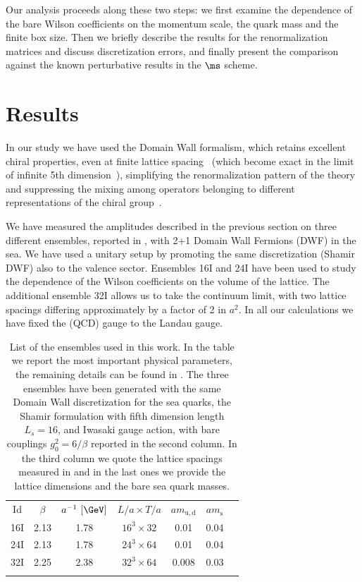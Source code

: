 \documentclass[aps,prd,twocolumn,nofootinbib,showpacs,superscriptaddress]{revtex4-1}
\begin{document}
Our analysis proceeds along these two steps: we first examine the dependence of 
the bare Wilson coefficients on the momentum scale, the quark mass and the finite box size.
Then we briefly describe the results for the renormalization matrices 
and discuss discretization errors, 
and finally present the comparison against the known perturbative results
in the $\ms$ scheme.


\section{Results}

In our study we have used 
the Domain Wall formalism, 
which retains excellent chiral properties, even at finite 
lattice spacing~\cite{Blum:1996jf,Blum:1997mz} %
(which become exact in the limit of
infinite 5th dimension~\cite{Shamir:1993zy,Furman:1994ky}), 
simplifying the renormalization pattern of the theory and 
suppressing the mixing among operators belonging to different representations of the chiral group~\cite{Blum:2001xb}.

We have measured the amplitudes described in the previous section on three different ensembles, 
reported in , with 2+1 Domain Wall Fermions (DWF) in the sea. 
We have used a unitary setup by promoting the same discretization (Shamir DWF)
also to the valence sector. Ensembles 16I and 24I have been used to study the
dependence of the Wilson coefficients on the volume of the lattice. The additional ensemble 32I 
allows us to take the continuum limit, with two lattice spacings differing approximately by
a factor of 2 in $a^2$. In all our calculations we have fixed the (QCD) gauge to the Landau gauge.\\


\begin{table}
\begin{tabular}{ccccccc}
\toprule
Id & $\beta$ & $a^{-1}~[\GeV]$ & $L/a \times T/a$ & $am_\mathrm{u,d}$ & $am_\mathrm s$\\
\colrule
16I & 2.13 & 1.78 & $16^3 \times 32$ & 0.01  &  0.04 \\
24I & 2.13 & 1.78 & $24^3 \times 64$ & 0.01  &  0.04 \\
32I & 2.25 & 2.38 & $32^3 \times 64$ & 0.008 &  0.03 \\ 
\botrule
\end{tabular}
\caption{List of the ensembles used in this work. In the table we report the most important
physical parameters, the remaining details can be found in . 
The three ensembles have been generated with
the same Domain Wall discretization for the sea quarks, 
the Shamir formulation with  
fifth dimension length $L_s = 16$, 
and Iwasaki gauge action, 
with bare couplings $g_0^2= 6 / \beta$ reported in the second column.
In the third column we quote the lattice spacings measured in  
and in the last ones we provide the lattice dimensions and the bare sea quark masses.
}
\label{tab:ensembles}
\end{table}
\end{document}
